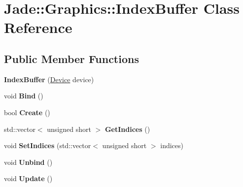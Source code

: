 \hypertarget{class_jade_1_1_graphics_1_1_index_buffer}{}\section{Jade\+:\+:Graphics\+:\+:Index\+Buffer Class Reference}
\label{class_jade_1_1_graphics_1_1_index_buffer}
\subsection*{Public Member Functions}
\begin{DoxyCompactItemize}
\item 
\hypertarget{class_jade_1_1_graphics_1_1_index_buffer_ab161ad20ef8eb63d0999dc5178e2e6ad}{}{\bfseries Index\+Buffer} (\hyperlink{class_jade_1_1_graphics_1_1_device}{Device} device)\label{class_jade_1_1_graphics_1_1_index_buffer_ab161ad20ef8eb63d0999dc5178e2e6ad}

\item 
\hypertarget{class_jade_1_1_graphics_1_1_index_buffer_a4fea66a67ad7b7749371aa8d77a2bee6}{}void {\bfseries Bind} ()\label{class_jade_1_1_graphics_1_1_index_buffer_a4fea66a67ad7b7749371aa8d77a2bee6}

\item 
\hypertarget{class_jade_1_1_graphics_1_1_index_buffer_ad067f6d2cb0d44a9632a8e4f24f4aa88}{}bool {\bfseries Create} ()\label{class_jade_1_1_graphics_1_1_index_buffer_ad067f6d2cb0d44a9632a8e4f24f4aa88}

\item 
\hypertarget{class_jade_1_1_graphics_1_1_index_buffer_a7f06c3aaf86b88e9ade9f2afb7a9506f}{}std\+::vector$<$ unsigned short $>$ {\bfseries Get\+Indices} ()\label{class_jade_1_1_graphics_1_1_index_buffer_a7f06c3aaf86b88e9ade9f2afb7a9506f}

\item 
\hypertarget{class_jade_1_1_graphics_1_1_index_buffer_a5b7de08cd03f8accf8b1ef8c06ea6ad0}{}void {\bfseries Set\+Indices} (std\+::vector$<$ unsigned short $>$ indices)\label{class_jade_1_1_graphics_1_1_index_buffer_a5b7de08cd03f8accf8b1ef8c06ea6ad0}

\item 
\hypertarget{class_jade_1_1_graphics_1_1_index_buffer_ac1823843a553d316de77059603e00e63}{}void {\bfseries Unbind} ()\label{class_jade_1_1_graphics_1_1_index_buffer_ac1823843a553d316de77059603e00e63}

\item 
\hypertarget{class_jade_1_1_graphics_1_1_index_buffer_a5a7cfe59046b8d31229052cb55d88d31}{}void {\bfseries Update} ()\label{class_jade_1_1_graphics_1_1_index_buffer_a5a7cfe59046b8d31229052cb55d88d31}

\end{DoxyCompactItemize}


